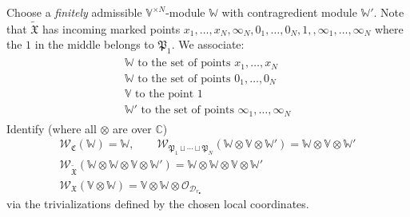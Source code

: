 \documentclass[11pt,b5paper,notitlepage]{article}
\theoremstyle{definition}
\theoremstyle{plain}
\newcommand{\fk}{\mathfrak}
\newcommand{\wtd}{\widetilde}
\newcommand{\blt}{\bullet}
\newcommand{\Vbb}{\mathbb V}
\newcommand{\Wbb}{\mathbb W}
\newcommand{\Cbb}{\mathbb C}
\newcommand{\<}{\left\langle}
\renewcommand{\>}{\right\rangle}
\newcommand{\MO}{\mathcal{O}}
\newcommand{\fx}{\mathfrak{X}}
\newcommand{\SW}{\mathscr{W}}
\newcommand{\MD}{\mathcal{D}}
\newcommand{\FC}{\mathfrak{C}}
\numberwithin{equation}{subsection}
\begin{document}
     
Choose a \emph{finitely} admissible $\Vbb^{\times N}$-module $\Wbb$ with contragredient module $\Wbb'$. Note that $\wtd{\fk X}$ has incoming marked points $x_1,\dots,x_N,\infty_N,0_1,\dots,0_N,1,,\infty_1,\dots,\infty_N$ where the  $1$ in the middle belongs to $\fk P_1$. We associate:
\begin{gather}
\begin{gathered}
\Wbb\text{ to the set of points }x_1,\dots,x_N\\
\Wbb\text{ to the set of points }0_1,\dots,0_N\\
\Vbb\text{ to the point }1\\
\Wbb'\text{ to the set of points }\infty_1,\dots,\infty_N
\end{gathered}
\end{gather}
Identify (where all $\otimes$ are over $\Cbb$)
    \begin{gather*}
        \SW_{\FC}(\Wbb)=\Wbb,    \qquad    \SW_{\fk P_1\sqcup\cdots\sqcup\fk P_N}(\Wbb\otimes \Vbb\otimes \Wbb')=\Wbb\otimes \Vbb\otimes \Wbb'\\
        \SW_{\wtd{\fk X}}(\Wbb\otimes\Wbb\otimes\Vbb\otimes\Wbb')=\Wbb\otimes\Wbb\otimes\Vbb\otimes\Wbb'\\
        \SW_{\fx}(\Vbb\otimes \Wbb)=\Vbb\otimes \Wbb\otimes \MO_{\MD_{r_\blt}}
    \end{gather*}
via the trivializations defined by the chosen local coordinates. 
\end{document}
